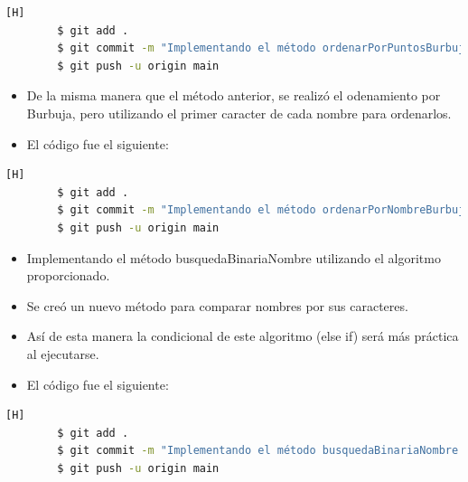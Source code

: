 \documentclass{article}
\begin{document}
    \begin{lstlisting}[language=bash,caption={Commit: Implementando el método ordenarPorPuntosBurbuja usando el método intercambiar y el algoritmo de ordenamiento por burbuja}][H]
		$ git add .
		$ git commit -m "Implementando el método ordenarPorPuntosBurbuja usando el método intercambiar y el algoritmo de ordenamiento por burbuja"			
		$ git push -u origin main
	\end{lstlisting}


 \begin{itemize}	
        \item De la misma manera que el método anterior, se realizó el odenamiento por Burbuja, pero utilizando el primer caracter de cada nombre para ordenarlos.
	\item El código fue el siguiente:
    \end{itemize}
    
    
    \begin{lstlisting}[language=bash,caption={Commit: Implementando el método ordenarPorNombreBurbuja usando un cast a la primera letra de los nombre para asi ordenarlos alfabéticamente}][H]
		$ git add .
		$ git commit -m "Implementando el método ordenarPorNombreBurbuja usando un cast a la primera letra de los nombre para asi ordenarlos alfabéticamente"			
		$ git push -u origin main
	\end{lstlisting}


 \begin{itemize}	
        \item Implementando el método busquedaBinariaNombre utilizando el algoritmo proporcionado.
        \item Se creó un nuevo método para comparar nombres por sus caracteres.
        \item Así de esta manera la condicional de este algoritmo (else if) será más práctica al ejecutarse.	
 \item El código fue el siguiente:
    \end{itemize}
    
    
    \begin{lstlisting}[language=bash,caption={Commit: Implementando el método busquedaBinariaNombre usando un nuevo método creado para compara valores de dos strings (nombres)}][H]
		$ git add .
		$ git commit -m "Implementando el método busquedaBinariaNombre usando un nuevo método creado para compara valores de dos strings (nombres)"			
		$ git push -u origin main
	\end{lstlisting}
\end{document}
